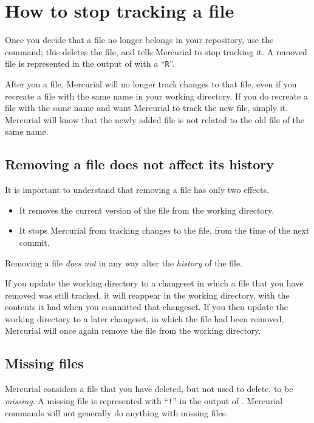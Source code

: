 \section{How to stop tracking a file}

Once you decide that a file no longer belongs in your repository, use
the  command; this deletes the file, and tells Mercurial
to stop tracking it.  A removed file is represented in the output of
 with a ``\texttt{R}''.

After you  a file, Mercurial will no longer track
changes to that file, even if you recreate a file with the same name
in your working directory.  If you do recreate a file with the same
name and want Mercurial to track the new file, simply  it.
Mercurial will know that the newly added file is not related to the
old file of the same name.

\subsection{Removing a file does not affect its history}

It is important to understand that removing a file has only two
effects.
\begin{itemize}
\item It removes the current version of the file from the working
  directory.
\item It stops Mercurial from tracking changes to the file, from the
  time of the next commit.
\end{itemize}
Removing a file \emph{does not} in any way alter the \emph{history} of
the file.

If you update the working directory to a changeset in which a file
that you have removed was still tracked, it will reappear in the
working directory, with the contents it had when you committed that
changeset.  If you then update the working directory to a later
changeset, in which the file had been removed, Mercurial will once
again remove the file from the working directory.

\subsection{Missing files}

Mercurial considers a file that you have deleted, but not used
 to delete, to be \emph{missing}.  A missing file is
represented with ``\texttt{!}'' in the output of .
Mercurial commands will not generally do anything with missing files.

